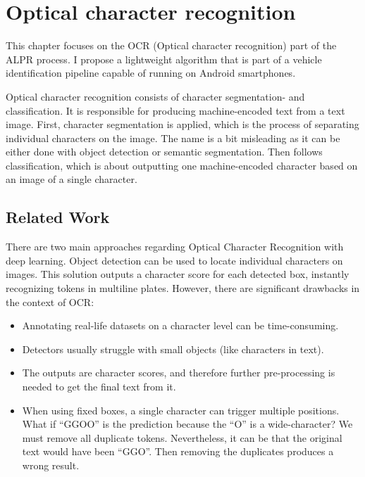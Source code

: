 \chapter{Optical character recognition}

This chapter focuses on the OCR (Optical character recognition) part of the ALPR process. I propose a lightweight algorithm that is part of a vehicle identification pipeline capable of running on Android smartphones. 

Optical character recognition consists of character segmentation- and classification. It is responsible for producing machine-encoded text from a text image. First, character segmentation is applied, which is the process of separating individual characters on the image. The name is a bit misleading as it can be either done with object detection or semantic segmentation. Then follows classification, which is about outputting one machine-encoded character based on an image of a single character.

\section{Related Work}

There are two main approaches regarding Optical Character Recognition with deep learning. Object detection can be used to locate individual characters on images. This solution outputs a character score for each detected box, instantly recognizing tokens in multiline plates. However, there are significant drawbacks in the context of OCR\cite{CTCexp}:

\begin{itemize}
  \item Annotating real-life datasets on a character level can be time-consuming.
  \item Detectors usually struggle with small objects (like characters in text).
  \item The outputs are character scores, and therefore further pre-processing is needed to get the final text from it.
  \item When using fixed boxes, a single character can trigger multiple positions. What if ``GGOO'' is the prediction because the ``O'' is a wide-character? We must remove all duplicate tokens. Nevertheless, it can be that the original text would have been ``GGO''. Then removing the duplicates produces a wrong result.
\end{itemize}

